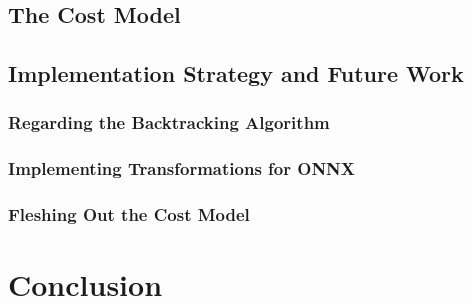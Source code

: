 \documentclass[10pt a4paper twoside]{report}
\begin{document}
	\section{The Cost Model}
		

	\section{Implementation Strategy and Future Work}

		\subsection{Regarding the Backtracking Algorithm}

		\subsection{Implementing Transformations for ONNX}

		\subsection{Fleshing Out the Cost Model}

\chapter{Conclusion}

\end{document}

